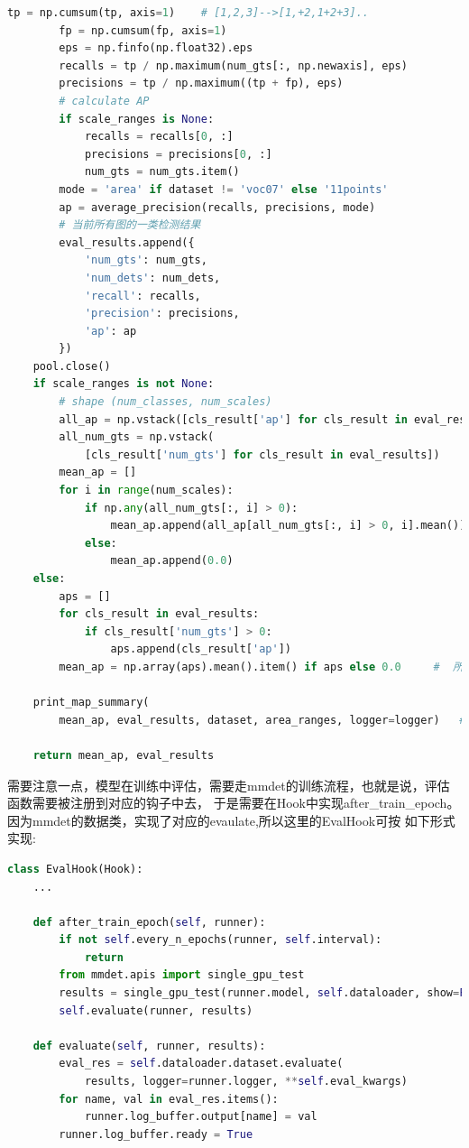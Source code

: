 \documentclass[UTF8]{ctexart}
\begin{document}
\begin{lstlisting}[language=Python]
        tp = np.cumsum(tp, axis=1)    # [1,2,3]-->[1,+2,1+2+3]..
        fp = np.cumsum(fp, axis=1)
        eps = np.finfo(np.float32).eps
        recalls = tp / np.maximum(num_gts[:, np.newaxis], eps)
        precisions = tp / np.maximum((tp + fp), eps)
        # calculate AP
        if scale_ranges is None:
            recalls = recalls[0, :]
            precisions = precisions[0, :]
            num_gts = num_gts.item()
        mode = 'area' if dataset != 'voc07' else '11points'
        ap = average_precision(recalls, precisions, mode)
        # 当前所有图的一类检测结果
        eval_results.append({
            'num_gts': num_gts,
            'num_dets': num_dets,
            'recall': recalls,
            'precision': precisions,
            'ap': ap
        })
    pool.close()
    if scale_ranges is not None:
        # shape (num_classes, num_scales)
        all_ap = np.vstack([cls_result['ap'] for cls_result in eval_results])
        all_num_gts = np.vstack(
            [cls_result['num_gts'] for cls_result in eval_results])
        mean_ap = []
        for i in range(num_scales):
            if np.any(all_num_gts[:, i] > 0):
                mean_ap.append(all_ap[all_num_gts[:, i] > 0, i].mean())
            else:
                mean_ap.append(0.0)
    else:
        aps = []
        for cls_result in eval_results:
            if cls_result['num_gts'] > 0:
                aps.append(cls_result['ap'])
        mean_ap = np.array(aps).mean().item() if aps else 0.0　　　#  所有类的平均ap-->mAP

    print_map_summary(
        mean_ap, eval_results, dataset, area_ranges, logger=logger)   # 好看的打印

    return mean_ap, eval_results

\end{lstlisting}


需要注意一点，模型在训练中评估，需要走mmdet的训练流程，也就是说，评估函数需要被注册到对应的钩子中去，
于是需要在Hook中实现after\_train\_epoch。因为mmdet的数据类，实现了对应的evaulate,所以这里的EvalHook可按
如下形式实现:

\lstset{style=mystyle}
\begin{lstlisting}[language=Python]
class EvalHook(Hook):
    ...
    
    def after_train_epoch(self, runner):
        if not self.every_n_epochs(runner, self.interval):
            return
        from mmdet.apis import single_gpu_test
        results = single_gpu_test(runner.model, self.dataloader, show=False)
        self.evaluate(runner, results)

    def evaluate(self, runner, results):
        eval_res = self.dataloader.dataset.evaluate(
            results, logger=runner.logger, **self.eval_kwargs)
        for name, val in eval_res.items():
            runner.log_buffer.output[name] = val
        runner.log_buffer.ready = True
    
\end{lstlisting}
\end{document}
